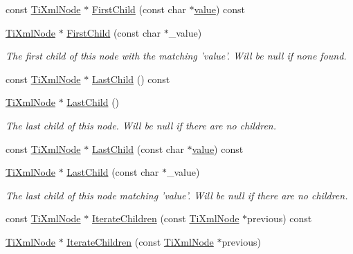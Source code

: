 \begin{DoxyCompactItemize}
\item 
const \hyperlink{class_ti_xml_node}{Ti\-Xml\-Node} $\ast$ \hyperlink{class_ti_xml_node_a1f05828d023150706eeb16d6fb3f6355}{First\-Child} (const char $\ast$\hyperlink{fmod__dsp_8h_a6a4f8a1a444e9080b297963b3db29fe0}{value}) const 
\item 
\hyperlink{class_ti_xml_node}{Ti\-Xml\-Node} $\ast$ \hyperlink{class_ti_xml_node_abc8bf32be6419ec453a731868de19554}{First\-Child} (const char $\ast$\-\_\-value)
\begin{DoxyCompactList}\small\item\em The first child of this node with the matching 'value'. Will be null if none found. \end{DoxyCompactList}\item 
const \hyperlink{class_ti_xml_node}{Ti\-Xml\-Node} $\ast$ \hyperlink{class_ti_xml_node_a6d671107e00cca1d28cb2d7f3a87a21e}{Last\-Child} () const 
\item 
\hyperlink{class_ti_xml_node}{Ti\-Xml\-Node} $\ast$ \hyperlink{class_ti_xml_node_a6432d2b2495f6caf9cb4278df706a031}{Last\-Child} ()
\begin{DoxyCompactList}\small\item\em The last child of this node. Will be null if there are no children. \end{DoxyCompactList}\item 
const \hyperlink{class_ti_xml_node}{Ti\-Xml\-Node} $\ast$ \hyperlink{class_ti_xml_node_ae9e2a400ef5156155df3eff16d88bf37}{Last\-Child} (const char $\ast$\hyperlink{fmod__dsp_8h_a6a4f8a1a444e9080b297963b3db29fe0}{value}) const 
\item 
\hyperlink{class_ti_xml_node}{Ti\-Xml\-Node} $\ast$ \hyperlink{class_ti_xml_node_abad5bf1059c48127b958711ef89e8e5d}{Last\-Child} (const char $\ast$\-\_\-value)
\begin{DoxyCompactList}\small\item\em The last child of this node matching 'value'. Will be null if there are no children. \end{DoxyCompactList}\item 
const \hyperlink{class_ti_xml_node}{Ti\-Xml\-Node} $\ast$ \hyperlink{class_ti_xml_node_a8621196ba3705fa226bef4a761cc51b6}{Iterate\-Children} (const \hyperlink{class_ti_xml_node}{Ti\-Xml\-Node} $\ast$previous) const 
\item 
\hyperlink{class_ti_xml_node}{Ti\-Xml\-Node} $\ast$ \hyperlink{class_ti_xml_node_a2358e747118fdbf0e467b1e4f7d03de1}{Iterate\-Children} (const \hyperlink{class_ti_xml_node}{Ti\-Xml\-Node} $\ast$previous)

\end{DoxyCompactItemize}
